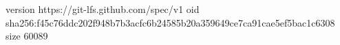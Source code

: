version https://git-lfs.github.com/spec/v1
oid sha256:f45c76ddc202f948b7b3acfc6b24585b20a359649ce7ca91cae5ef5bac1c6308
size 60089
